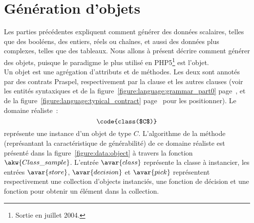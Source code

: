 \section{Génération d'objets}
\label{section:data:objects}

Les parties précédentes expliquent comment générer des données scalaires, telles
que des booléens, des entiers, réels ou chaînes, et aussi des données plus
complexes, telles que des tableaux. Nous allons à présent décrire comment
générer des objets, puisque le paradigme le plus utilisé en PHP5\footnote{Sortie
en juillet 2004.} est l'objet. \\

Un objet est une agrégation d'attributs et de méthodes. Les deux sont annotés
par des contrats Praspel, respectivement par la clause \ainvariant et les autres
clauses (voir les entités syntaxiques  et
 de la figure~\ref{figure:language:grammar_part0}
page~\pageref{figure:language:grammar_part0}, et de la
figure~\ref{figure:language:typical_contract}
page~\pageref{figure:language:typical_contract} pour les positionner). Le
domaine réaliste~:
%
$$\code{class($C$)}$$
%
représente une instance d'un objet de type $C$. L'algorithme de la méthode
 (représantant la caractéristique de générabilité) de ce domaine
réaliste est présenté dans la figure~\ref{figure:data:object} à travers la
fonction $\akw{Class\_sample}$. L'entrée $\avar{class}$ représente la classe à
instancier, les entrées $\avar{store}$, $\avar{decision}$ et $\avar{pick}$
représentent respectivement une collection d'objects instanciés, une fonction
de décision et une fonction pour obtenir un élément dans la collection.
%

